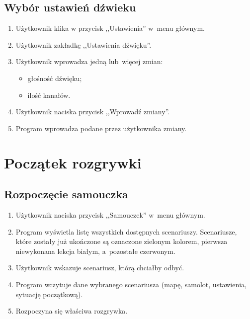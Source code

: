 \documentclass{mwrep}
\begin{document}
\section{Wybór ustawień dźwieku}
\begin{enumerate}
  \item Użytkownik klika w przycisk ,,Ustawienia'' w~menu głównym.
  \item Użytkownik zakładkę ,,Ustawienia dźwięku''.
  \item Użytkownik wprowadza jedną lub~więcej zmian:
  \begin{itemize}
    \item głośność dźwięku;
    \item ilość kanałów.
  \end{itemize}
  \item Użytkownik naciska przycisk ,,Wprowadź zmiany''.
  \item Program wprowadza podane przez użytkownika zmiany.
\end{enumerate}

\chapter{Początek rozgrywki}
\section{Rozpoczęcie samouczka}
\begin{enumerate}
  \item Użytkownik naciska przycisk ,,Samouczek'' w~menu głównym.
  \item Program wyświetla listę wszystkich dostępnych scenariuszy. Scenariusze, które zostały już ukończone są oznaczone zielonym kolorem, pierwsza niewykonana lekcja białym, a~pozostałe czerwonym.
  \item Użytkownik wskazuje scenariusz, którą chciałby odbyć.
  \item Program wczytuje dane wybranego scenariusza (mapę, samolot, ustawienia, sytuację początkową).
  \item Rozpoczyna się właściwa rozgrywka.
\end{enumerate}
\end{document}
